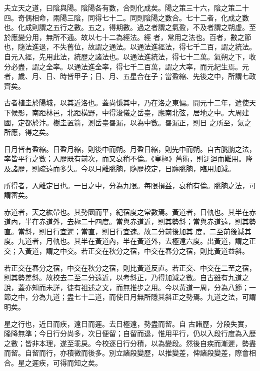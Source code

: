 \begin{pinyinscope}
 夫立天之道，曰陰與陽。陰陽各有數，合則化成矣。陽之策三十六，陰之策二十四。奇偶相命，兩陽三陰，同得七十二。同則陰陽之數合。七十二者，化成之數也。化成則謂之五行之數。五之，得期數。過之者謂之氣盈，不及者謂之朔虛。至於應變分用，無所不通。故以七十二為經法。經
 者，常用之法也。百者，數之節也，隨法進退，不失舊位，故謂之通法。以通法進經法，得七千二百，謂之統法。自元入經，先用此法，統歷之諸法也。以通法進統法，得七十二萬。氣朔之下，收分必盡，謂之全率。以通法進全率，得七千二百萬，謂之大率，而元紀生焉。元者，歲、月、日、時皆甲子；日、月、五星合在子；當盈縮、先後之中，所謂七政齊矣。



 古者植圭於陽城，以其近洛也。蓋尚慊其中，乃在洛之東偏。開元十二年，遣使天下候影，南距林邑，北距橫野，中得浚儀之岳臺，應南北弦，居地之中。大周建國，定都於汴。樹圭置箭，測岳臺晷漏，以為中數。晷漏正，則日
 之所至，氣之所應，得之矣。



 日月皆有盈縮。日盈月縮，則後中而朔。月盈日縮，則先中而朔。自古朓朒之法，率皆平行之數；入歷既有前次，而又衰稍不倫。《皇極》舊術，則迂迴而難用。降及諸歷，則疏遠而多失。今以月離朓朒，隨歷校定，日躔朓朒，臨用加減。



 所得者，入離定日也。一日之中，分為九限。每限損益，衰稍有倫。朓朒之法，可謂審矣。



 赤道者，天之紘帶也。其勢圜而平，紀宿度之常數焉。黃道者，日軌也。其半在赤道內，半在赤道外，去極二十四度。當與赤道近，則其勢斜；當與赤道遠，則其勢直。當斜，則日行宜遲；當直，則日行宜速。故二分前後加其
 度，二至前後減其度。九道者，月軌也。其半在黃道內，半在黃道外，去極遠六度。出黃道，謂之正交；入黃道，謂之中交。若正交在秋分之宿，中交在春分之宿，則比黃道益斜。



 若正交在春分之宿，中交在秋分之宿，則比黃道反直。若正交、中交在二至之宿，則其勢差斜。故校去二至二分遠近，以考斜正，乃得加減之數。自古雖有九道之說，蓋亦知而未詳，徒有祖述之文，而無推步之用。今以黃道一周，分為八節；一節之中，分為九道；盡七十二道，而使日月無所隱其斜正之勢焉。九道之法，可謂明矣。



 星之行也，近日而疾，遠日而遲。去日極遠，勢盡而留。自
 古諸歷，分段失實，隆降無準；今日行分尚多，次日便留；自留而退，惟用平行，仍以入段行度為入歷之數；皆非本理，遂至乖戾。今校逐日行分積，以為變段。然後自疾而漸遲，勢盡而留。自留而行，亦積微而後多。別立諸段變歷，以推變差，俾諸段變差，際會相合。星之遲疾，可得而知之矣。




\end{pinyinscope}
